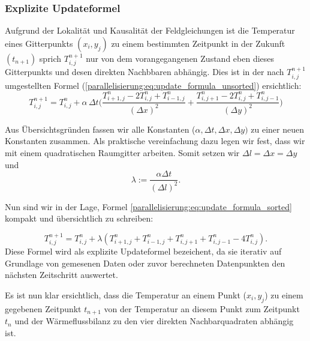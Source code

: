 \subsubsection{Explizite Updateformel}
\label{parallelisierung:sec:update_formel}


Aufgrund der Lokalität und Kausalität der Feldgleichungen ist die Temperatur eines Gitterpunkts \( (x_i, y_j)\) zu einem bestimmten Zeitpunkt in der Zukunft \( (t_{n+1})\) sprich \(T_{i,j}^{n+1}\) nur von dem  vorangegangenen Zustand eben dieses Gitterpunkts und desen direkten Nachbbaren abhängig.
Dies ist  in der nach \(T_{i,j}^{n+1}\) umgestellten Formel (\ref{parallelisierung:eq:update_formula_unsorted}) ersichtlich:
\begin{equation}
	\label{parallelisierung:eq:update_formula_sorted}
	T_{i,j}^{n+1}
	=
	T_{i,j}^n
	+
	\alpha \, \Delta t \biggl(
	\frac{T_{i+1,j}^n - 2 T_{i,j}^n + T_{i-1,j}^n}{(\Delta x)^2}
	+
	\frac{T_{i,j+1}^n - 2 T_{i,j}^n + T_{i,j-1}^n}{(\Delta y)^2}
	\biggr)
\end{equation}

Aus Übersichtsgründen fassen wir alle Konstanten (\(\alpha, \Delta t, \Delta x, \Delta y) \) zu einer neuen Konstanten zusammen.
Als praktische vereinfachung dazu legen wir fest, dass wir mit einem quadratischen Raumgitter arbeiten. Somit setzen wir  \(\Delta l = \Delta x = \Delta y\) und
\begin{equation}
	\label{parallelisierung:eq:lambda}
	\lambda 
	:= 
	\frac{\alpha \Delta t}{(\Delta l)^2}.
\end{equation}

Nun sind wir in der Lage, Formel \eqref{parallelisierung:eq:update_formula_sorted} kompakt und übersichtlich zu schreiben:

\begin{equation}
	\label{parallelisierung:eq:update_formel}
	T_{i,j}^{n+1}
	=
	T_{i,j}^n +
	\lambda \left(
	T_{i+1,j}^n + T_{i-1,j}^n + T_{i,j+1}^n + T_{i,j-1}^n - 4 T_{i,j}^n
	\right).
\end{equation}
Diese Formel wird als explizite Updateformel bezeichent, da sie iterativ auf Grundlage von gemesenen Daten oder zuvor berechneten Datenpunkten den nächsten Zeitschritt auswertet.

Es ist nun klar ersichtlich, dass die Temperatur an einem Punkt (\(x_i, y_j\)) zu einem gegebenen Zeitpunkt \(t_{n+1}\)  von der Temperatur an diesem Punkt zum Zeitpunkt \(t_n\) und der Wärmeflussbilanz zu den vier direkten Nachbarquadraten abhängig ist.

